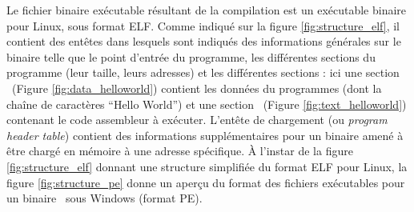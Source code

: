 Le fichier binaire exécutable résultant de la compilation est un exécutable binaire pour Linux, sous format ELF.
Comme indiqué sur la figure \ref{fig:structure_elf}, il contient des entêtes dans lesquels sont indiqués des informations générales sur le binaire telle que le point d'entrée du programme, les différentes sections du programme (leur taille, leurs adresses) et les différentes sections : ici une section \pdata\ (Figure \ref{fig:data_helloworld}) contient les données du programmes (dont la chaîne de caractères ``Hello World'') et une section \ptext\ (Figure \ref{fig:text_helloworld}) contenant le code assembleur à exécuter. L'entête de chargement (ou \emph{program header table}) contient des informations supplémentaires pour un binaire amené à être chargé en mémoire à une adresse spécifique.
À l'instar de la figure \ref{fig:structure_elf} donnant une structure simplifiée du format ELF pour Linux, la figure \ref{fig:structure_pe} donne un aperçu du format des fichiers exécutables pour un binaire \xq\ sous Windows (format PE).



